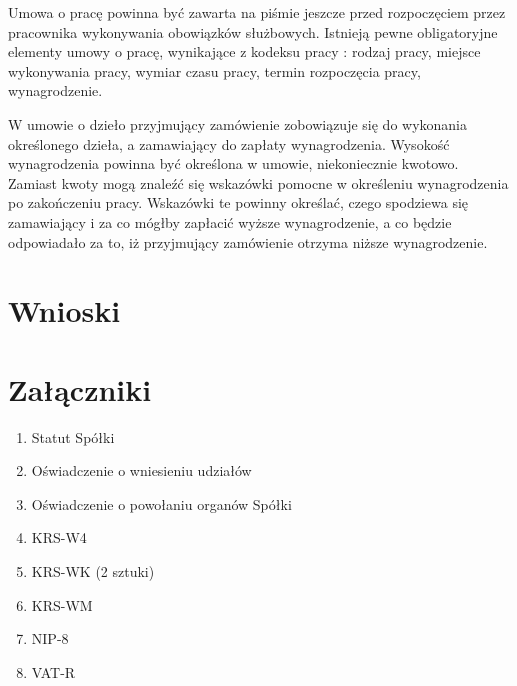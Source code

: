 \documentclass[11pt]{article}
\begin{document}
   Umowa o pracę powinna być zawarta na piśmie jeszcze przed rozpoczęciem przez pracownika wykonywania obowiązków służbowych. Istnieją pewne obligatoryjne elementy umowy o pracę, wynikające z kodeksu pracy : rodzaj pracy, miejsce wykonywania pracy, wymiar czasu pracy, termin rozpoczęcia pracy, wynagrodzenie.
    
  W umowie o dzieło przyjmujący zamówienie zobowiązuje się do wykonania określonego dzieła, a zamawiający do zapłaty wynagrodzenia. Wysokość wynagrodzenia powinna być określona w umowie, niekoniecznie kwotowo. Zamiast kwoty mogą znaleźć się wskazówki pomocne w określeniu wynagrodzenia po zakończeniu pracy. Wskazówki te powinny określać, czego spodziewa się zamawiający i za co mógłby zapłacić wyższe wynagrodzenie, a co będzie odpowiadało za to, iż przyjmujący zamówienie otrzyma niższe wynagrodzenie.
  
	\section{Wnioski}
    
    \section{Załączniki}
    \begin{enumerate}
    	\item Statut Spółki
    	\item Oświadczenie o wniesieniu udziałów
    	\item Oświadczenie o powołaniu organów Spółki
    	\item KRS-W4
    	\item KRS-WK (2 sztuki)
    	\item KRS-WM
    	\item NIP-8
    	\item VAT-R
    \end{enumerate}
\end{document}
